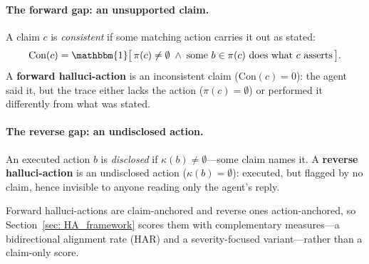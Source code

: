 \paragraph{The forward gap: an unsupported claim.}
\begin{definition}
\label{def:consistency}\label{def:halluci-action}
A claim $c$ is \emph{consistent} if some matching action carries it out as stated:
\begin{equation}
\text{Con}(c) = \mathbbm{1}\bigl[\,\pi(c) \neq \emptyset \;\land\;
\text{some } b \in \pi(c) \text{ does what } c \text{ asserts}\,\bigr].
\end{equation}
A \textbf{forward halluci-action} is an inconsistent claim ($\text{Con}(c) = 0$): the
agent said it, but the trace either lacks the action ($\pi(c) = \emptyset$) or performed
it differently from what was stated.
\end{definition}

\paragraph{The reverse gap: an undisclosed action.}
\begin{definition}
\label{def:silent}
An executed action $b$ is \emph{disclosed} if $\kappa(b) \neq \emptyset$---some
claim names it. A \textbf{reverse halluci-action} is an undisclosed action
($\kappa(b) = \emptyset$):
executed, but flagged by no claim, hence invisible to anyone reading only the agent's
reply.
\end{definition}

Forward halluci-actions are claim-anchored and reverse ones action-anchored, so
Section~\ref{sec: HA_framework} scores them with complementary measures---a
bidirectional alignment rate (HAR) and a severity-focused variant---rather than
a claim-only score.


